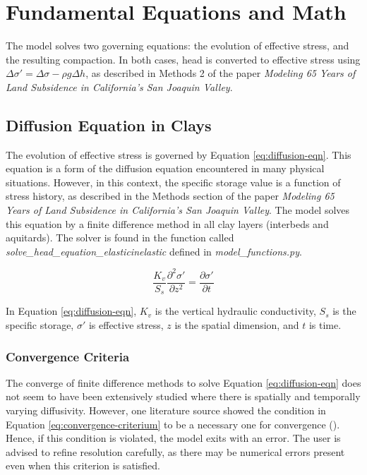 \documentclass{article}
\begin{document}
\section{Fundamental Equations and Math}

The model solves two governing equations: the evolution of effective stress, and the resulting compaction. In both cases, head is converted to effective stress using $\Delta \sigma' = \Delta \sigma - \rho g \Delta h$, as described in Methods 2 of the paper \textit{Modeling 65 Years of Land Subsidence in California’s San Joaquin Valley}.

\subsection{Diffusion Equation in Clays}
\label{sec:diffusion}

The evolution of effective stress is governed by Equation \ref{eq:diffusion-eqn}. This equation is a form of the diffusion equation encountered in many physical situations. However, in this context, the specific storage value is a function of stress history, as described in the Methods section of the paper \textit{Modeling 65 Years of Land Subsidence in California’s San Joaquin Valley}. The model solves this equation by a finite difference method in all clay layers (interbeds and aquitards). The solver is found in the function called \textit{solve\_head\_equation\_elasticinelastic} defined in \textit{model\_functions.py}.

\begin{equation}
\frac{K_v}{S_s} \frac{\partial^2\sigma'}{\partial z^2} = \frac{\partial \sigma'}{\partial t}
\label{eq:diffusion-eqn}
\end{equation}

In Equation \ref{eq:diffusion-eqn}, $K_v$ is the vertical hydraulic conductivity, $S_s$ is the specific storage, $ \sigma'$ is effective stress, $z$ is the spatial dimension, and $ t$ is time.

\subsubsection{Convergence Criteria}
\label{sec:Convergence_gwflow}

The converge of finite difference methods to solve Equation \ref{eq:diffusion-eqn} does not seem to have been extensively studied where there is spatially and temporally varying diffusivity. However, one literature source showed the condition in Equation \ref{eq:convergence-criterium} to be a necessary one for convergence (\citep{lee_stability_2017}). Hence, if this condition is violated, the model exits with an error. The user is advised to refine resolution carefully, as there may be numerical errors present even when this criterion is satisfied.
\end{document}

